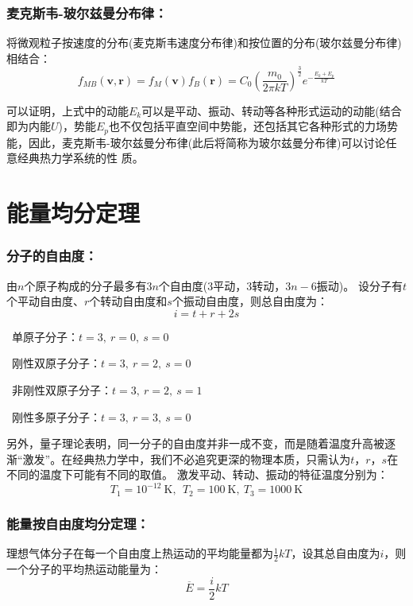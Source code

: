 \documentclass[zihao=5,UTF8]{report}
\begin{document}
\subsubsection{麦克斯韦-玻尔兹曼分布律：}
将微观粒子按速度的分布(麦克斯韦速度分布律)和按位置的分布(玻尔兹曼分布律)相结合：
\begin{equation}
    f_{MB}(\boldsymbol{v},\boldsymbol{r} ) =f_M(\boldsymbol{v})f_B(\boldsymbol{r})= C_0\left(\frac{m_0}{2\pi kT}\right)^{\frac{3}{2}}e^{-\frac{E_k + E_p}{kT}}
\end{equation}\par
可以证明，上式中的动能$E_k$可以是平动、振动、转动等各种形式运动的动能(结合即为内能$U$)，势能$E_p$也不仅包括平直空间中势能，还包括其它各种形式的力场势能，因此，麦克斯韦-玻尔兹曼分布律(此后将简称为玻尔兹曼分布律)可以讨论任意经典热力学系统的性
质。

\section{能量均分定理}
\subsubsection{分子的自由度：}
由$n$个原子构成的分子最多有$3n$个自由度($3$平动，$3$转动，$3n-6$振动)。
设分子有$t$个平动自由度、$r$个转动自由度和$s$个振动自由度，则总自由度为：
\begin{equation}
    i = t + r + 2s
\end{equation}\par
{}\ 单原子分子：$t = 3,\ r = 0,\ s = 0$\par
{}\ 刚性双原子分子：$t = 3,\ r = 2,\ s = 0$\par
{}\ 非刚性双原子分子：$t = 3,\ r = 2,\ s = 1$\par
{}\ 刚性多原子分子：$t = 3,\ r = 3,\ s = 0$\par
另外，量子理论表明，同一分子的自由度并非一成不变，而是随着温度升高被逐渐“激发”。在经典热力学中，我们不必追究更深的物理本质，只需认为$t$，$r$，$s$在不同的温度下可能有不同的取值。
激发平动、转动、振动的特征温度分别为：
\begin{equation}
    T_1 = 10^{-12}\ \mathrm{K},\ \ T_2 = 100\ \mathrm{K},\ T_3 = 1000\ \mathrm{K}
\end{equation}
\subsubsection{能量按自由度均分定理：}
理想气体分子在每一个自由度上热运动的平均能量都为$\frac{1}{2}kT$，设其总自由度为$i$，则一个分子的平均热运动能量为：
\begin{equation}
    \overline{E} = \frac{i}{2}kT
\end{equation}
\end{document}
